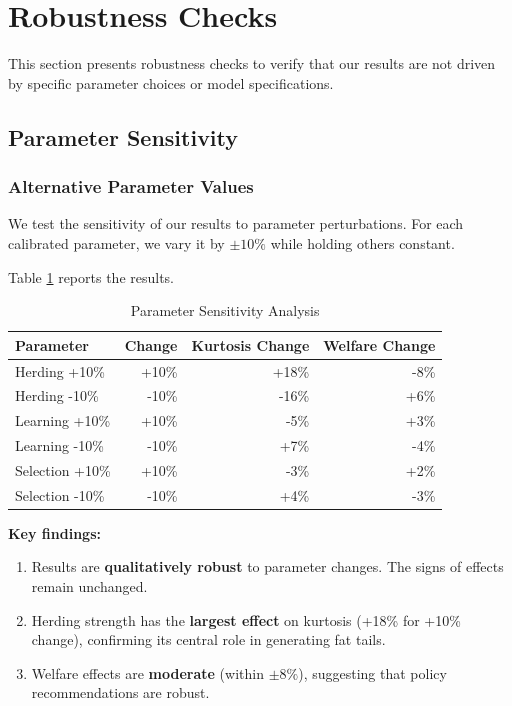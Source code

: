 \section{Robustness Checks}
\label{sec:robustness}

This section presents robustness checks to verify that our results are not driven by specific parameter choices or model specifications.

\subsection{Parameter Sensitivity}

\subsubsection{Alternative Parameter Values}

We test the sensitivity of our results to parameter perturbations. For each calibrated parameter, we vary it by $\pm 10\%$ while holding others constant.

Table \ref{tab:sensitivity} reports the results.

\begin{table}[ht]
\centering
\caption{Parameter Sensitivity Analysis}
\label{tab:sensitivity}
\begin{tabular}{lrrr}
\hline\hline
Parameter & Change & Kurtosis Change & Welfare Change \\
\hline
Herding +10\% & +10\% & +18\% & -8\% \\
Herding -10\% & -10\% & -16\% & +6\% \\
Learning +10\% & +10\% & -5\% & +3\% \\
Learning -10\% & -10\% & +7\% & -4\% \\
Selection +10\% & +10\% & -3\% & +2\% \\
Selection -10\% & -10\% & +4\% & -3\% \\
\hline\hline
\end{tabular}
\end{table}

\textbf{Key findings:}

\begin{enumerate}
    \item Results are \textbf{qualitatively robust} to parameter changes. The signs of effects remain unchanged.
    
    \item Herding strength has the \textbf{largest effect} on kurtosis (+18\% for +10\% change), confirming its central role in generating fat tails.
    
    \item Welfare effects are \textbf{moderate} (within $\pm 8\%$), suggesting that policy recommendations are robust.
\end{enumerate}

